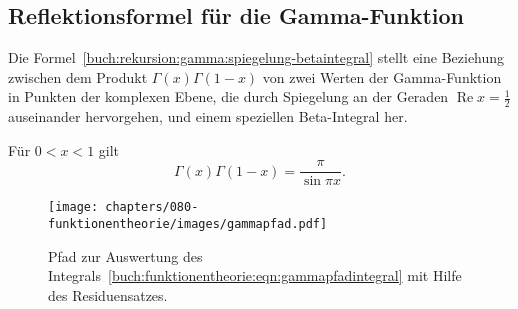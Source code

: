 %
%
%
\subsection{Reflektionsformel für die Gamma-Funktion
\label{buch:funktionentheorie:subsection:gammareflektion}}
Die Formel~\eqref{buch:rekursion:gamma:spiegelung-betaintegral}
stellt eine Beziehung zwischen dem Produkt $\Gamma(x)\Gamma(1-x)$
von zwei Werten der Gamma-Funktion in Punkten der komplexen Ebene,
die durch Spiegelung an der Geraden $\operatorname{Re}x=\frac12$
auseinander hervorgehen, und einem speziellen Beta-Integral her.

\begin{satz}
%
\label{buch:funktionentheorie:satz:spiegelungsformel}
Für $0<x<1$ gilt
\begin{equation}
\Gamma(x)\Gamma(1-x)
=
\frac{\pi}{\sin\pi x}.
\end{equation}
%
\end{satz}

\begin{figure}
\centering
\texttt{[image: chapters/080-funktionentheorie/images/gammapfad.pdf]}
\caption{Pfad zur Auswertung des
Integrals~\eqref{buch:funktionentheorie:eqn:gammapfadintegral}
mit Hilfe des Residuensatzes.
\label{buch:funktionentheorie:fig:gammapfad}}
\end{figure}

